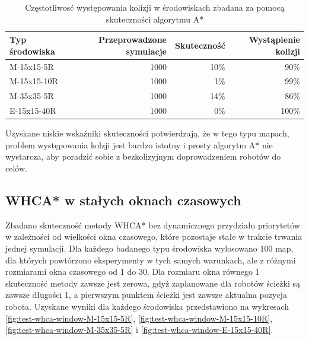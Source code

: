 \begin{table}
\caption{Częstotliwosć występowania kolizji w środowiskach zbadana za pomocą skuteczności algorytmu A*} \label{tab:test-collision-frequency} 
\centering
\begin{tabular}{| l | r | r | r |}
\hline
{\bf Typ środowiska} & {\bf Przeprowadzone symulacje} & {\bf Skuteczność} & {\bf Wystąpienie kolizji} \\ \hline
M-15x15-5R  & 1000 & 10\% & 90\% \\ \hline
M-15x15-10R & 1000 & 1\%  & 99\%  \\ \hline
M-35x35-5R  & 1000 & 14\% & 86\% \\ \hline
E-15x15-40R & 1000 & 0\%  & 100\%  \\ \hline
\end{tabular}
\end{table}

Uzyskane niskie wskaźniki skuteczności potwierdzają, że w tego typu mapach, problem występowania kolzji jest bardzo istotny i prosty algorytm A* nie wystarcza, aby poradzić sobie z bezkolizyjnym doprowadzeniem robotów do celów.

\subsection{WHCA* w stałych oknach czasowych}
Zbadano skuteczność metody WHCA* bez dynamicznego przydziału priorytetów w zależności od wielkości okna czasowego, które pozostaje stałe w trakcie trwania jednej symulacji.
Dla każdego badanego typu środowiska wylosowano 100 map, dla których powtórzono eksperymenty w tych samych warunkach, ale z różnymi rozmiarami okna czasowego od 1 do 30.
Dla rozmiaru okna równego 1 skuteczność metody zawsze jest zerowa, gdyż zaplanowane dla robotów ścieżki są zawsze długości 1, a pierwszym punktem ścieżki jest zawsze aktualna pozycja robota.
Uzyskane wyniki dla każdego środowiska przedstawiono na wykresach \ref{fig:test-whca-window-M-15x15-5R}, \ref{fig:test-whca-window-M-15x15-10R}, \ref{fig:test-whca-window-M-35x35-5R} i \ref{fig:test-whca-window-E-15x15-40R}.

